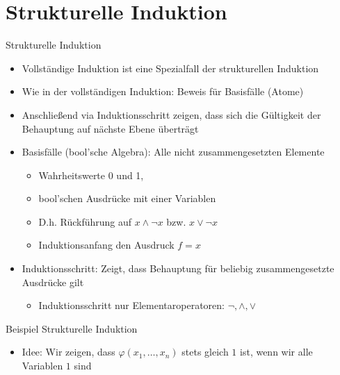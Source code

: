 \documentclass[12pt%
,aspectratio=169%
]{beamer}
\begin{document}
\section{Strukturelle Induktion}
\begin{frame}{Strukturelle Induktion}
\begin{itemize}
	\item Vollständige Induktion ist eine Spezialfall der strukturellen Induktion
	\item Wie in der vollständigen Induktion: Beweis für Basisfälle (Atome)
	\item Anschließend via Induktionsschritt zeigen, dass sich die Gültigkeit der Behauptung auf nächste Ebene überträgt
	\item Basisfälle (bool'sche Algebra): Alle nicht zusammengesetzten Elemente
	\begin{itemize}
		\item Wahrheitswerte 0 und 1,
		\item bool'schen Ausdrücke mit einer Variablen
		\item D.h. Rückführung auf $x \land \neg x$ bzw. $x \lor \neg x$
		\item Induktionsanfang den Ausdruck $f = x$
	\end{itemize}
	\item Induktionsschritt: Zeigt, dass Behauptung für beliebig zusammengesetzte Ausdrücke gilt
	\begin{itemize}
		\item Induktionsschritt nur Elementaroperatoren: $\neg, \land, \lor$
	\end{itemize}
\end{itemize}
\end{frame}


\begin{frame}{Beispiel Strukturelle Induktion}
\begin{itemize}
\begin{theorem}
	Sei $\varphi$ ein beliebiger boolescher Ausdruck, in dem neben den Variablen $x_1,\ldots , x_n$ ausschließlich der Implikationsoperator vorkommt.\\
	Dann ist $\varphi$ stets erfüllbar.
	\end{theorem}
	\item Idee: Wir zeigen, dass $\varphi(x_1,\ldots, x_n)$ stets gleich $1$ ist, wenn wir alle Variablen $1$ sind
\end{itemize}
\end{frame}
\end{document}
